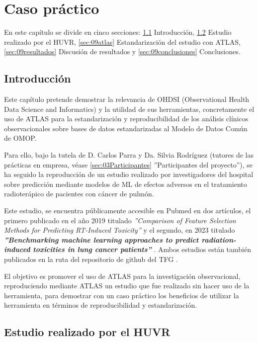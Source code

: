 \chapter{Caso práctico}\label{cap:09caso}
En este capítulo se divide en cinco secciones: \ref{sec:09intro} Introducción, \ref{sec:09huvr} Estudio realizado por el HUVR, \ref{sec:09atlas} Estandarización del estudio con ATLAS, \ref{sec:09resultados} Discusión de resultados y \ref{sec:09conclusiones} Conclusiones.

\section{Introducción} \label{sec:09intro}

Este capítulo pretende demostrar la relevancia de OHDSI (Observational Health Data Science and Informatics) y la utilidad de sus herramientas, concretamente el uso de ATLAS para la estandarización y reproducibilidad de los análisis clínicos observacionales sobre bases de datos estandarizadas al Modelo de Datos Común de OMOP. 

Para ello, bajo la tutela de D. Carlos Parra y Da. Silvia Rodríguez (tutores de las prácticas en empresa, véase \ref{sec:03Participantes} ''Participantes del proyecto''), se ha seguido la reproducción de un estudio realizado por investigadores del hospital sobre predicción mediante modelos de ML de efectos adversos en el tratamiento radioterápico de pacientes con cáncer de pulmón. 

Este estudio, se encuentra públicamente accesible en Pubmed en dos artículos, el primero publicado en el año 2019 titulado \textit{''Comparison of Feature Selection Methods for Predicting RT-Induced Toxicity'' }\parencite{nunez2019comparison} y el segundo, en 2023 titulado \textbf{\textit{''Benchmarking machine learning approaches to predict radiation-induced toxicities in lung cancer patients''}} \parencite{nunez2023benchmarking}. Ambos estudios están también publicados en la ruta  del repositorio de github del TFG \parencite{vallealonsodc}.

El objetivo es promover el uso de ATLAS para la investigación observacional, reproduciendo mediante ATLAS un estudio que fue realizado sin hacer uso de la herramienta, para demostrar con un caso práctico los beneficios de utilizar la herramienta en términos de reproducibilidad y estandarización.

\section{Estudio realizado por el HUVR} \label{sec:09huvr}

